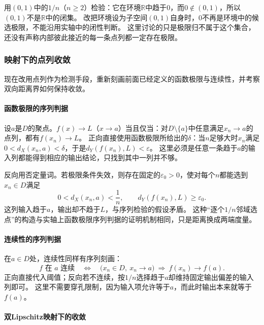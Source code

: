 用$(0,1)$中的$1/n$（$n\geq2$）检验：它在环境$\mathbb R$中趋于$0$，而$0\notin(0,1)$，所以$(0,1)$不是$\mathbb R$中的闭集。
改把环境设为子空间$(0,1)$自身时，$0$不再是环境中的候选极限，不能沿用实轴中的闭性判断。
这里讨论的只是极限归不属于这个集合，还没有声称内部彼此接近的每一条点列都一定存在极限。

\subsubsection{映射下的点列收敛}
\label{sec:metric-map-sequence-tests}

现在改用点列作为检测手段，重新刻画前面已经定义的函数极限与连续性，并考察双向距离界如何保持收敛。

\paragraph{函数极限的序列判据}

设$a$是$D$的聚点。$f(x)\to L$（$x\to a$）当且仅当：对$D\setminus\{a\}$中任意满足$x_n\to a$的点列，都有$f(x_n)\to L$。
正向直接使用函数极限所给出的$\delta$：当$n$足够大时$x_n$满足$0<d_X(x_n,a)<\delta$，于是$d_Y(f(x_n),L)<\varepsilon$。
这里必须是任意一条趋于$a$的输入列都能得到相应的输出结论，只找到其中一列并不够。

反向用否定量词。若极限条件失效，则存在固定的$\varepsilon_0>0$，使对每个$n$都能选到$x_n\in D$满足
\[
  0<d_X(x_n,a)<\frac1n,\qquad d_Y(f(x_n),L)\geq\varepsilon_0.
\]
这列输入趋于$a$，输出却不趋于$L$，与序列检验的假设矛盾。
这种“逐个$1/n$邻域选点”的构造与实轴上函数极限序列判据的证明机制相同，只是距离换成两端度量。

\paragraph{连续性的序列判据}

在$a\in D$处，连续性同样有序列刻画：
\begin{equation}
\label{eq:metric-continuity-sequential}
  f\text{ 在 }a\text{ 连续}
  \quad\Longleftrightarrow\quad
  \bigl(x_n\in D,\ x_n\to a\bigr)\ \Longrightarrow\ f(x_n)\to f(a).
\end{equation}
正向直接代入阈值；反向若不连续，按$1/n$选择趋于$a$却维持固定输出偏差的输入列即可。
这里不需要穿孔限制，因为输入项允许等于$a$，而此时输出本来就等于$f(a)$。

\paragraph{双Lipschitz映射下的收敛}

